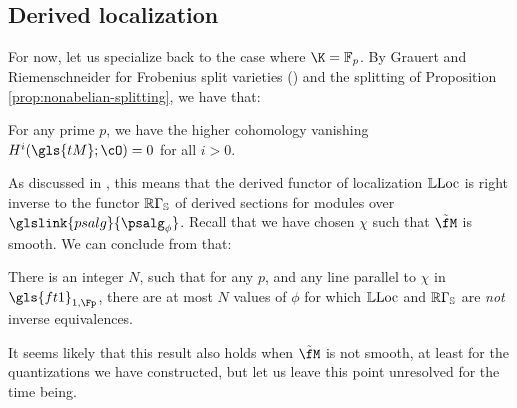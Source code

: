 \subsection{Derived localization}

For now, let us specialize back to the case where $\K=\mathbb{F}_p$.  By  Grauert and Riemenschneider for Frobenius split varieties (\cite{MR1156382}) and the splitting of Proposition \ref{prop:nonabelian-splitting}, we have that:
\begin{corollary}\label{cor:cohomology-vanishing}
For any prime $p$, we have the higher cohomology vanishing $H^i(\gls{tM};\cO)=0$ for all $i>0$.
\end{corollary}
As discussed in \cite{KalDEQ}, this means that the
derived functor of localization $\mathbb{L}\!\operatorname{Loc}$ is right inverse to the
functor  $\mathbb{R}\Gamma_{\mathbb{S}}$ of derived sections for modules over $\glslink{psalg}{\psalg_\phi}$.  
Recall that we have chosen $\chi$ such that  $\tilde{\fM}$ is smooth. We can conclude from \cite[Thm. 4.2]{KalDEQ} that:

\begin{lemma}\label{lem:upper-bound}
  There is an integer $N$, such that for any $p$, and any line parallel to $\chi$ in $\gls{ft1}_{1,\Fp}$, there are at most $N$ values of $\phi$ for which $\mathbb{L}\!\operatorname{Loc}$ and $\mathbb{R}\Gamma_{\mathbb{S}}$ are {\em not} inverse equivalences.  
\end{lemma}
\begin{remark}
It seems likely that this result also holds when $\tilde{\fM}$ is not smooth, at least for the quantizations we have constructed, but let us leave this point unresolved for the time being.
\end{remark}

